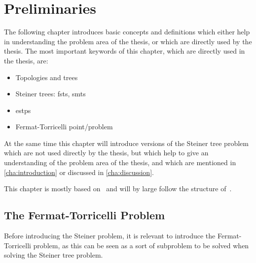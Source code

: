 {
\abnormalparskip{0pt}
\chapter{Preliminaries}
\label{cha:preliminaries}
}

The following chapter introduces basic concepts and definitions which either
help in understanding the problem area of the thesis, or which are directly used
by the thesis. The most important keywords of this chapter, which are directly
used in the thesis, are:
%
\begin{itemize}
\item Topologies and trees
\item Steiner trees: \aclp{fst}, \aclp{smt}
\item \aclp{estp}
\item Fermat-Torricelli point/problem
\end{itemize}
%
At the same time this chapter will introduce versions of the Steiner tree
problem which are not used directly by the thesis, but which help to give an
understanding of the problem area of the thesis, and which are mentioned in
\cref{cha:introduction} or discussed in \cref{cha:discussion}.

This chapter is mostly based on~\textcite{smith1992,gilbert1968,brazil2015} and
will by large follow the structure of~\cite[ch.~1]{brazil2015}.

\section{The Fermat-Torricelli Problem}
\label{sec:ferm-torr-probl}

Before introducing the Steiner problem, it is relevant to introduce the
Fermat-Torricelli problem, as this can be seen as a sort of subproblem to be
solved when solving the Steiner tree problem.

\newpage

